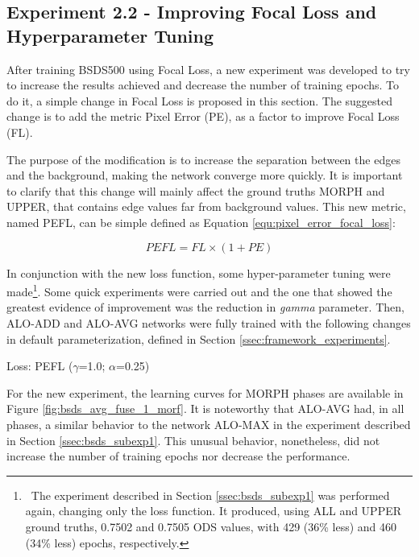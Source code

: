 \subsection{Experiment 2.2 - Improving Focal Loss and Hyperparameter Tuning}
\label{ssec:bsds_subexp2}

After training BSDS500 using Focal Loss, a new experiment was developed to try to increase the results achieved and decrease the number of training epochs.
To do it, a simple change in Focal Loss is proposed in this section.
The suggested change is to add the metric Pixel Error (PE), as a factor to improve Focal Loss (FL).

The purpose of the modification is to increase the separation between the edges and the background, making the network converge more quickly.
It is important to clarify that this change will mainly affect the ground truths MORPH and UPPER, that contains edge values far from background values.
This new metric, named PEFL, can be simple defined as Equation \ref{equ:pixel_error_focal_loss}:

\begin{equation}
  PEFL = FL \times (1 + PE)
  \label{equ:pixel_error_focal_loss}
\end{equation}

In conjunction with the new loss function, some hyper-parameter tuning were made\footnote{~The experiment described in Section \ref{ssec:bsds_subexp1} was performed again, changing only the loss function. It produced, using ALL and UPPER ground truths, 0.7502 and 0.7505 ODS values, with 429 (36\% less) and 460 (34\% less) epochs, respectively.}.
Some quick experiments were carried out and the one that showed the greatest evidence of improvement was the reduction in \textit{gamma} parameter.
Then, ALO-ADD and ALO-AVG networks were fully trained with the following changes in default parameterization, defined in Section \ref{ssec:framework_experiments}.

\begin{center}
Loss: PEFL ($\gamma$=1.0; $\alpha$=0.25)
\end{center}

For the new experiment, the learning curves for MORPH phases are available in Figure \ref{fig:bsds_avg_fuse_1_morf}.
It is noteworthy that ALO-AVG had, in all phases, a similar behavior to the network ALO-MAX in the experiment described in Section \ref{ssec:bsds_subexp1}.
This unusual behavior, nonetheless, did not increase the number of training epochs nor decrease the performance.

